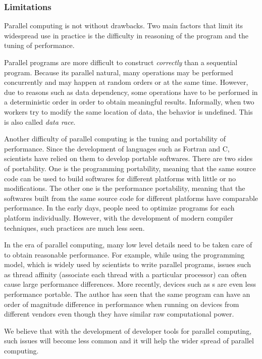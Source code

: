 \subsubsection{Limitations}
\label{ssub:Limitations}

Parallel computing is not without drawbacks. Two main factors that limit its widespread use in practice is the difficulty in reasoning of the program and the tuning of performance.

Parallel programs are more difficult to construct \emph{correctly} than a sequential program. Because its parallel natural, many operations may be performed concurrently and may happen at random orders or at the same time. However, due to reasons such as data dependency, some operations have to be performed in a deterministic order in order to obtain meaningful results. Informally, when two workers try to modify the same location of data, the behavior is undefined. This is also called \emph{data race}.

Another difficulty of parallel computing is the tuning and portability of performance. Since the development of languages such as Fortran and C, scientists have relied on them to develop portable softwares. There are two sides of portability. One is the programming portability, meaning that the same source code can be used to build softwares for different platforms with little or no modifications. The other one is the performance portability, meaning that the softwares built from the same source code for different platforms have comparable performance. In the early days, people need to optimize programs for each platform individually. However, with the development of modern compiler techniques, such practices are much less seen.

In the era of parallel computing, many low level details need to be taken care of to obtain reasonable performance. For example, while using the \openmp programming model, which is widely used by scientists to write parallel programs, issues such as thread affinity (associate each thread with a particular processor) can often cause large performance differences. More recently, devices such as \gpu{}s are even less performance portable. The author has seen that the same \opencl \cite{opencl} program can have an order of magnitude difference in performance when running on devices from different vendors even though they have similar raw computational power.

We believe that with the development of developer tools for parallel computing, such issues will become less common and it will help the wider spread of parallel computing.


